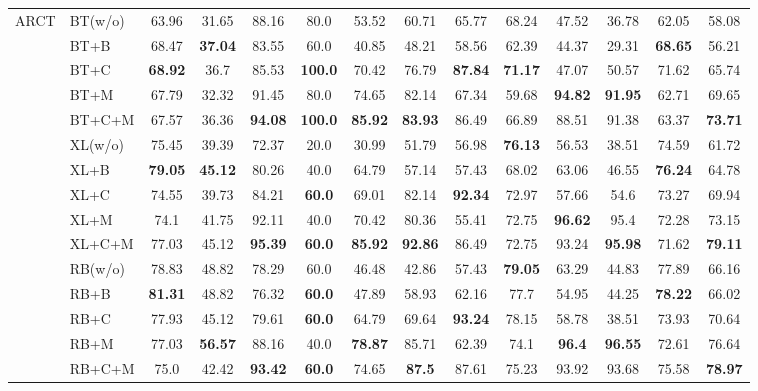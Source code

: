 \documentclass{ecai}  %
\begin{document}
\begin{multicols}{2}
\begin{center}
\begin{table}[H]
\begin{tabularx}{\textwidth}{ll|c|ccccccccccc}
	\midrule
\multirow{15}{*}{ARCT} 
 		    
                &  BT(w/o) &63.96&31.65&88.16&80.0&53.52&60.71&65.77&68.24&47.52&36.78&62.05&58.08
                						\\ 
		&  BT+B &68.47&\bf{37.04}&83.55&60.0&40.85&48.21&58.56&62.39&44.37&29.31&\bf{68.65}&56.21
 						        \\ 
		&  BT+C & \bf{68.92} &36.7&85.53&\bf{100.0}&70.42&76.79&\bf{87.84}&\bf{71.17}&47.07&50.57&71.62&65.74
 						        \\ 
		   & BT+M &67.79&32.32&91.45&80.0&74.65&82.14&67.34&59.68&\bf{94.82}&\bf{91.95}&62.71&69.65
 						       \\ 
		   & BT+C+M& 67.57&36.36&\bf{94.08}&\bf{100.0}&\bf{85.92}&\bf{83.93}&86.49&66.89&88.51&91.38&63.37&\bf{73.71}
		
 					     	       \\ \cmidrule{2-14}
						          
			&  XL(w/o) & 75.45&39.39&72.37&20.0&30.99&51.79&56.98&\bf{76.13}&56.53&38.51&74.59&61.72
                						\\ 
		&  XL+B & \bf{79.05}&\bf{45.12}&80.26&40.0&64.79&57.14&57.43&68.02&63.06&46.55&\bf{76.24}&64.78
 						        \\ 
		&  XL+C & 74.55&39.73&84.21&\bf{60.0}&69.01&82.14&\bf{92.34}&72.97&57.66&54.6&73.27&69.94
 						        \\ 
		   & XL+M & 74.1&41.75&92.11&40.0&70.42&80.36&55.41&72.75&\bf{96.62}&95.4&72.28&73.15
 						       \\ 
		   & XL+C+M& 77.03&45.12&\bf{95.39}&\bf{60.0}&\bf{85.92}&\bf{92.86}&86.49&72.75&93.24&\bf{95.98}&71.62&\bf{79.11}
 					     	       \\ \cmidrule{2-14}
	&  RB(w/o) & 78.83&48.82&78.29&60.0&46.48&42.86&57.43&\bf{79.05}&63.29&44.83&77.89&66.16
                						\\ 
		&  RB+B & \bf{81.31}&48.82&76.32&\bf{60.0}&47.89&58.93&62.16&77.7&54.95&44.25&\bf{78.22}&66.02
 						        \\ 
		&  RB+C &77.93&45.12&79.61&\bf{60.0}&64.79&69.64&\bf{93.24}&78.15&58.78&38.51&73.93&70.64
 						        \\ 
		   & RB+M & 77.03&\bf{56.57}&88.16&40.0&\bf{78.87}&85.71&62.39&74.1&\bf{96.4}&\bf{96.55}&72.61&76.64
 						       \\ 
		   & RB+C+M&75.0&42.42&\bf{93.42}&\bf{60.0}&74.65&\bf{87.5}&87.61&75.23&93.92&93.68&75.58&\bf{78.97}
 					     	       \\ 


\end{tabularx}
\end{table}
\end{center}
\end{multicols}
\end{document}
